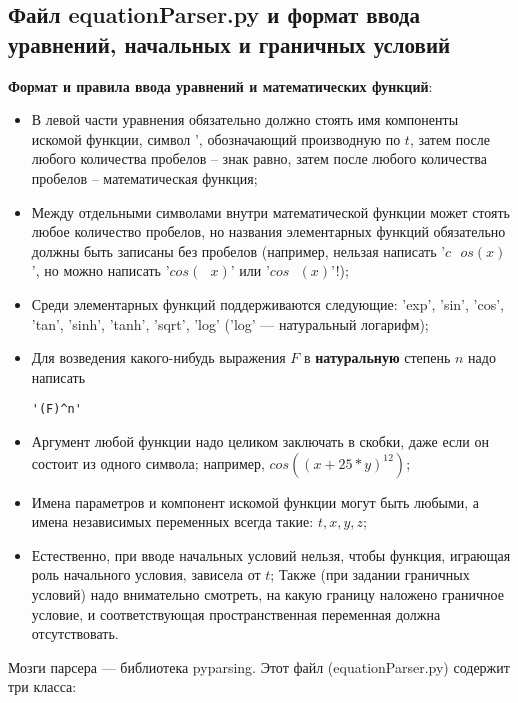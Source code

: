 \documentclass[a4paper]{article}
\begin{document}
\newpage
\subsection{\Large Файл equationParser.py и формат ввода уравнений, начальных и граничных условий}
{\bf Формат и правила ввода уравнений и математических функций}:
\begin{itemize}
\item В левой части уравнения обязательно должно стоять имя компоненты искомой функции, символ ', обозначающий производную по $t$, затем после любого количества пробелов -- знак равно, затем после любого количества пробелов -- математическая функция;
\item Между отдельными символами внутри математической функции может стоять любое количество пробелов, но названия элементарных функций обязательно должны быть записаны без пробелов (например, нельзая написать '$c\ \ \ os(x)$', но можно написать '$cos(\ \ \ x)$' или '$cos\ \ \ (x)$'!);
\item Среди элементарных функций поддерживаются следующие: 'exp', 'sin', 'cos', 'tan', 'sinh', 'tanh', 'sqrt', 'log' ('log' --- натуральный логарифм);
\item Для возведения какого-нибудь выражения $F$ в {\bf натуральную} степень $n$ надо написать \begin{verbatim}'(F)^n'\end{verbatim}
\item Аргумент любой функции надо целиком заключать в скобки, даже если он состоит из одного символа; например, $cos\left((x + 25*y)^{12}\right)$;
\item Имена параметров и компонент искомой функции могут быть любыми, а имена независимых переменных всегда такие: $t, x, y, z$;
\item Естественно, при вводе начальных условий нельзя, чтобы функция, играющая роль начального условия, зависела от $t$; Также (при задании граничных условий) надо внимательно смотреть, на какую границу наложено граничное условие, и соответствующая пространственная переменная должна отсутствовать.
\end{itemize}
Мозги парсера --- библиотека pyparsing. Этот файл (equationParser.py) содержит три класса:
\end{document}
